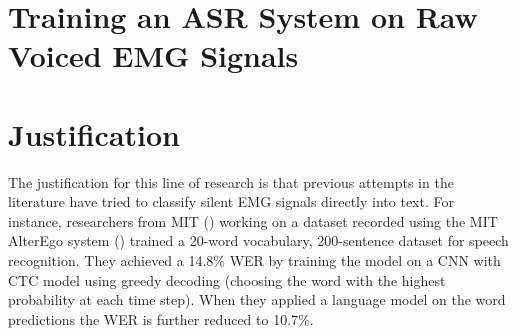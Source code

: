 \iffalse

\fi

\section{Training an ASR System on Raw Voiced EMG Signals}

\section{Justification}

The justification for this line of research is that previous attempts in
the literature have tried to classify silent EMG signals directly into text.
For instance, researchers from MIT (\cite{alter_ego_ctc})
working on a dataset recorded using the MIT AlterEgo system
(\cite{Kapur2018HumanmachineCC}) trained
a 20-word vocabulary, 200-sentence dataset for speech recognition. They
achieved a 14.8\% WER by training the model on a CNN with CTC model using
greedy decoding (choosing the word with the highest probability at each time
step). When they applied a language model on the word predictions the WER
is further reduced to 10.7\%.